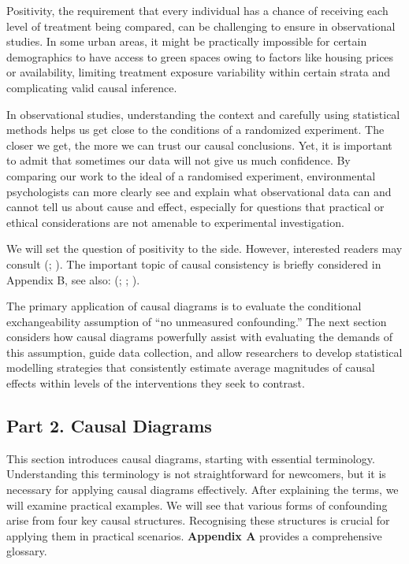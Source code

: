 \documentclass[
  singlecolumn]{article}
\begin{document}
Positivity, the requirement that every individual has a chance of
receiving each level of treatment being compared, can be challenging to
ensure in observational studies. In some urban areas, it might be
practically impossible for certain demographics to have access to green
spaces owing to factors like housing prices or availability, limiting
treatment exposure variability within certain strata and complicating
valid causal inference.

In observational studies, understanding the context and carefully using
statistical methods helps us get close to the conditions of a randomized
experiment. The closer we get, the more we can trust our causal
conclusions. Yet, it is important to admit that sometimes our data will
not give us much confidence. By comparing our work to the ideal of a
randomised experiment, environmental psychologists can more clearly see
and explain what observational data can and cannot tell us about cause
and effect, especially for questions that practical or ethical
considerations are not amenable to experimental investigation.

We will set the question of positivity to the side. However, interested
readers may consult (;
). The important
topic of causal consistency is briefly considered in Appendix B, see
also: (;
;
).

The primary application of causal diagrams is to evaluate the
conditional exchangeability assumption of ``no unmeasured confounding.''
The next section considers how causal diagrams powerfully assist with
evaluating the demands of this assumption, guide data collection, and
allow researchers to develop statistical modelling strategies that
consistently estimate average magnitudes of causal effects within levels
of the interventions they seek to contrast.

\subsection{Part 2. Causal Diagrams}\label{part-2.-causal-diagrams}

This section introduces causal diagrams, starting with essential
terminology. Understanding this terminology is not straightforward for
newcomers, but it is necessary for applying causal diagrams effectively.
After explaining the terms, we will examine practical examples. We will
see that various forms of confounding arise from four key causal
structures. Recognising these structures is crucial for applying them in
practical scenarios. \textbf{Appendix A} provides a comprehensive
glossary.
\end{document}
